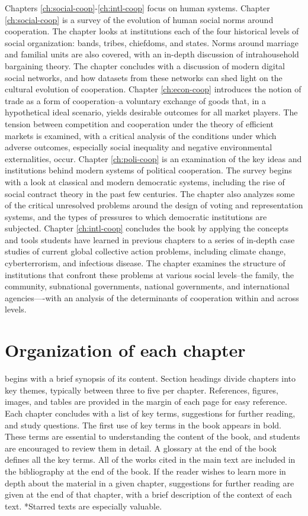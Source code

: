 \documentclass{tufte-book} %
\begin{document}
Chapters \ref{ch:social-coop}-\ref{ch:intl-coop} focus on human systems. Chapter \ref{ch:social-coop} is a survey of the evolution of human social norms around cooperation. The chapter looks at institutions each of the four historical levels of social organization: bands, tribes, chiefdoms, and states. Norms around marriage and familial units are also covered, with an in-depth discussion of intrahousehold bargaining theory. The chapter concludes with a discussion of modern digital social networks, and how datasets from these networks can shed light on the cultural evolution of cooperation. Chapter \ref{ch:econ-coop} introduces the notion of trade as a form of cooperation--a voluntary exchange of goods that, in a hypothetical ideal scenario, yields desirable outcomes for all market players. The tension between competition and cooperation under the theory of efficient markets is examined, with a critical analysis of the conditions under which adverse outcomes, especially social inequality and negative environmental externalities, occur. Chapter \ref{ch:poli-coop} is an examination of the key ideas and institutions behind modern systems of political cooperation. The survey begins with a look at classical and modern democratic systems, including the rise of social contract theory in the past few centuries. The chapter also analyzes some of the critical unresolved problems around the design of voting and representation systems, and the types of pressures to which democratic institutions are subjected. Chapter \ref{ch:intl-coop} concludes the book by applying the concepts and tools students have learned in previous chapters to a series of in-depth case studies of current global collective action problems, including climate change, cyberterrorism, and infectious disease. The chapter examines the structure of institutions that confront these problems at various social levels--the family, the community, subnational governments, national governments, and international agencies—-with an analysis of the determinants of cooperation within and across levels. 

\section{Organization of each chapter}

 begins with a brief synopsis of its content. Section headings divide chapters into key themes, typically between three to five per chapter. References, figures, images, and tables are provided in the margin of each page for easy reference. Each chapter concludes with a list of key terms, suggestions for further reading, and study questions. The first use of key terms in the book appears in bold. These terms are essential to understanding the content of the book, and students are encouraged to review them in detail. A glossary at the end of the book defines all the key terms. 
All of the works cited in the main text are included in the bibliography at the end of the book. If the reader wishes to learn more in depth about the material in a given chapter, suggestions for further reading are given at the end of that chapter, with a brief description of the context of each text. *Starred texts are especially valuable. 
\end{document}
